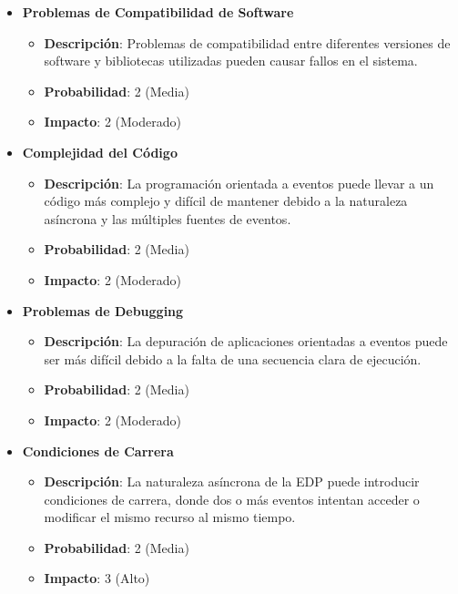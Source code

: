 \begin{itemize}
    \item \textbf{Problemas de Compatibilidad de Software}
          \begin{itemize}
              \item \textbf{Descripción}: Problemas de compatibilidad entre diferentes versiones de software y bibliotecas utilizadas pueden causar fallos en el sistema.
              \item \textbf{Probabilidad}: 2 (Media)
              \item \textbf{Impacto}: 2 (Moderado)
          \end{itemize}

    \item \textbf{Complejidad del Código}
          \begin{itemize}
              \item \textbf{Descripción}: La programación orientada a eventos puede llevar a un código más complejo y difícil de mantener debido a la naturaleza asíncrona y las múltiples fuentes de eventos.
              \item \textbf{Probabilidad}: 2 (Media)
              \item \textbf{Impacto}: 2 (Moderado)
          \end{itemize}

    \item \textbf{Problemas de Debugging}
          \begin{itemize}
              \item \textbf{Descripción}: La depuración de aplicaciones orientadas a eventos puede ser más difícil debido a la falta de una secuencia clara de ejecución.
              \item \textbf{Probabilidad}: 2 (Media)
              \item \textbf{Impacto}: 2 (Moderado)
          \end{itemize}

    \item \textbf{Condiciones de Carrera}
          \begin{itemize}
              \item \textbf{Descripción}: La naturaleza asíncrona de la EDP puede introducir condiciones de carrera, donde dos o más eventos intentan acceder o modificar el mismo recurso al mismo tiempo.
              \item \textbf{Probabilidad}: 2 (Media)
              \item \textbf{Impacto}: 3 (Alto)
          \end{itemize}


\end{itemize}
